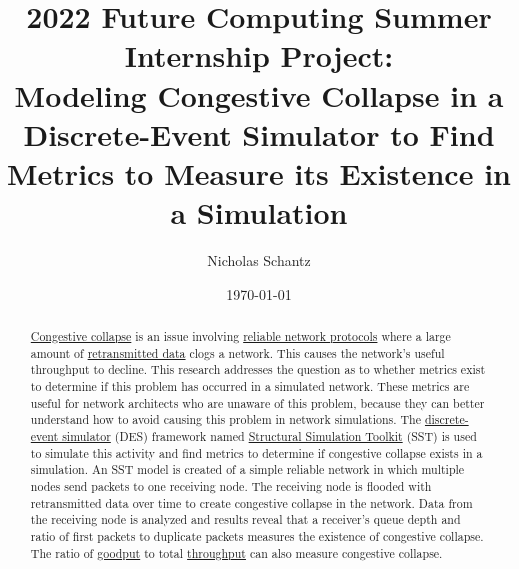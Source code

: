 \documentclass{article}
\begin{document}
    \begin{minipage}[h]{\textwidth}
        \title{2022 Future Computing Summer Internship Project:\\Modeling Congestive Collapse in a Discrete-Event Simulator to Find Metrics to Measure its Existence in a Simulation}
        \author{Nicholas Schantz}
        \date{\today}
            \maketitle
        \begin{abstract}
            \href{https://en.wikipedia.org/wiki/Network_congestion#Congestive_collapse}{Congestive collapse} is an issue involving \href{https://en.wikipedia.org/wiki/Reliability_(computer_networking}{reliable network protocols} where a large amount of \href{https://www.javatpoint.com/tcp-retransmission}{retransmitted data} clogs a network. This causes the network's useful throughput to decline. This research addresses the question as to whether metrics exist to determine if this problem has occurred in a simulated network. These metrics are useful for network architects who are unaware of this problem, because they can better understand how to avoid causing this problem in network simulations. The \href{https://en.wikipedia.org/wiki/Discrete-event_simulation}{discrete-event simulator} (DES) framework named \href{http://sst-simulator.org/}{Structural Simulation Toolkit} (SST) is used to simulate this activity and find metrics to determine if congestive collapse exists in a simulation. An SST model is created of a simple reliable network in which multiple nodes send packets to one receiving node. The receiving node is flooded with retransmitted data over time to create congestive collapse in the network. Data from the receiving node is analyzed and results reveal that a receiver's queue depth and ratio of first packets to duplicate packets  measures the existence of congestive collapse. The ratio of \href{https://en.wikipedia.org/wiki/Goodput}{goodput} to total \href{https://en.wikipedia.org/wiki/Network_throughput}{throughput} can also measure congestive collapse.
        \end{abstract}
    \end{minipage}

\ \\

\end{document}
